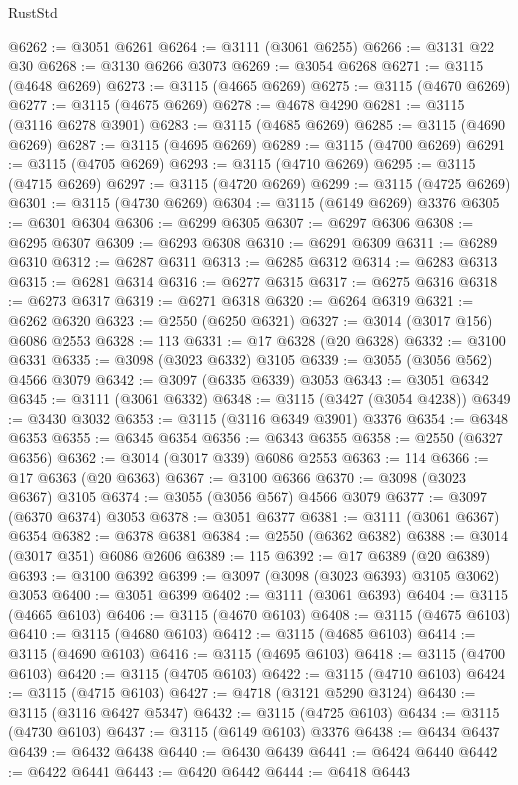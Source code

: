 \begin{lexlean}{RustStd}
\begin{coremodule}
@6262 := @3051 @6261
@6264 := @3111 (@3061 @6255)
@6266 := @3131 @22 @30
@6268 := @3130 @6266 @3073
@6269 := @3054 @6268
@6271 := @3115 (@4648 @6269)
@6273 := @3115 (@4665 @6269)
@6275 := @3115 (@4670 @6269)
@6277 := @3115 (@4675 @6269)
@6278 := @4678 @4290
@6281 := @3115 (@3116 @6278 @3901)
@6283 := @3115 (@4685 @6269)
@6285 := @3115 (@4690 @6269)
@6287 := @3115 (@4695 @6269)
@6289 := @3115 (@4700 @6269)
@6291 := @3115 (@4705 @6269)
@6293 := @3115 (@4710 @6269)
@6295 := @3115 (@4715 @6269)
@6297 := @3115 (@4720 @6269)
@6299 := @3115 (@4725 @6269)
@6301 := @3115 (@4730 @6269)
@6304 := @3115 (@6149 @6269) @3376
@6305 := @6301 @6304
@6306 := @6299 @6305
@6307 := @6297 @6306
@6308 := @6295 @6307
@6309 := @6293 @6308
@6310 := @6291 @6309
@6311 := @6289 @6310
@6312 := @6287 @6311
@6313 := @6285 @6312
@6314 := @6283 @6313
@6315 := @6281 @6314
@6316 := @6277 @6315
@6317 := @6275 @6316
@6318 := @6273 @6317
@6319 := @6271 @6318
@6320 := @6264 @6319
@6321 := @6262 @6320
@6323 := @2550 (@6250 @6321)
@6327 := @3014 (@3017 @156) @6086 @2553
@6328 := 113
@6331 := @17 @6328 (@20 @6328)
@6332 := @3100 @6331
@6335 := @3098 (@3023 @6332) @3105
@6339 := @3055 (@3056 @562) @4566 @3079
@6342 := @3097 (@6335 @6339) @3053
@6343 := @3051 @6342
@6345 := @3111 (@3061 @6332)
@6348 := @3115 (@3427 (@3054 @4238))
@6349 := @3430 @3032
@6353 := @3115 (@3116 @6349 @3901) @3376
@6354 := @6348 @6353
@6355 := @6345 @6354
@6356 := @6343 @6355
@6358 := @2550 (@6327 @6356)
@6362 := @3014 (@3017 @339) @6086 @2553
@6363 := 114
@6366 := @17 @6363 (@20 @6363)
@6367 := @3100 @6366
@6370 := @3098 (@3023 @6367) @3105
@6374 := @3055 (@3056 @567) @4566 @3079
@6377 := @3097 (@6370 @6374) @3053
@6378 := @3051 @6377
@6381 := @3111 (@3061 @6367) @6354
@6382 := @6378 @6381
@6384 := @2550 (@6362 @6382)
@6388 := @3014 (@3017 @351) @6086 @2606
@6389 := 115
@6392 := @17 @6389 (@20 @6389)
@6393 := @3100 @6392
@6399 := @3097 (@3098 (@3023 @6393) @3105 @3062) @3053
@6400 := @3051 @6399
@6402 := @3111 (@3061 @6393)
@6404 := @3115 (@4665 @6103)
@6406 := @3115 (@4670 @6103)
@6408 := @3115 (@4675 @6103)
@6410 := @3115 (@4680 @6103)
@6412 := @3115 (@4685 @6103)
@6414 := @3115 (@4690 @6103)
@6416 := @3115 (@4695 @6103)
@6418 := @3115 (@4700 @6103)
@6420 := @3115 (@4705 @6103)
@6422 := @3115 (@4710 @6103)
@6424 := @3115 (@4715 @6103)
@6427 := @4718 (@3121 @5290 @3124)
@6430 := @3115 (@3116 @6427 @5347)
@6432 := @3115 (@4725 @6103)
@6434 := @3115 (@4730 @6103)
@6437 := @3115 (@6149 @6103) @3376
@6438 := @6434 @6437
@6439 := @6432 @6438
@6440 := @6430 @6439
@6441 := @6424 @6440
@6442 := @6422 @6441
@6443 := @6420 @6442
@6444 := @6418 @6443

\end{coremodule}
\end{lexlean}
